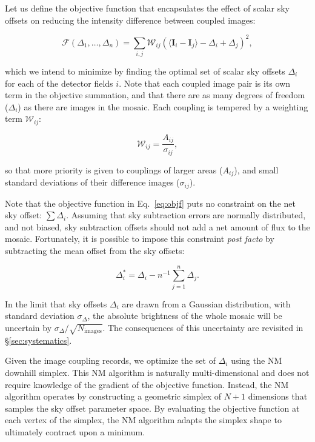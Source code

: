 \documentclass[iop]{emulateapj}
\newcommand{\vect}[1]{\boldsymbol{#1}} %
\newcommand{\Eq}[1]{Eq.~\ref{eq:#1}}  %
\newcommand{\Sec}[1]{\S\ref{sec:#1}}  %
\begin{document}
Let us define the objective function that encapsulates the effect of scalar sky offsets on reducing the intensity difference between coupled images:

\begin{equation}
    \mathcal{F} \left(\Delta_1,\ldots,\Delta_n \right) = \sum_{i,j} \mathcal{W}_{ij} \left( \langle \vect{I}_i - \vect{I}_j \rangle - \Delta_i + \Delta_j \right)^2,
    \label{eq:objf}
\end{equation}

\noindent which we intend to minimize by finding the optimal set of scalar sky offsets $\Delta_i$ for each of the detector fields $i$.
Note that each coupled image pair is its own term in the objective summation, and that there are as many degrees of freedom ($\Delta_i$) as there are images in the mosaic.
Each coupling is tempered by a weighting term $\mathcal{W}_{ij}$:

\begin{equation}
    \mathcal{W}_{ij} = \frac{A_{ij}}{\sigma_{ij}},
\end{equation}

\noindent so that more priority is given to couplings of larger areas ($A_{ij}$), and small standard deviations of their difference images ($\sigma_{ij}$).

Note that the objective function in \Eq{objf} puts no constraint on the net sky offset: $\sum \Delta_i$.
Assuming that sky subtraction errors are normally distributed, and not biased, sky subtraction offsets should not add a net amount of flux to the mosaic.
Fortunately, it is possible to impose this constraint \textit{post facto} by subtracting the mean offset from the sky offsets:

\begin{equation}
    \Delta_i^* = \Delta_i - n^{-1}\sum_{j=1}^n \Delta_j.
    \label{eq:netzero}
\end{equation}

\noindent In the limit that sky offsets $\Delta_i$ are drawn from a Gaussian distribution, with standard deviation $\sigma_\Delta$, the absolute brightness of the whole mosaic will be uncertain by $\sigma_\Delta / \sqrt{N_\mathrm{images}}$.
The consequences of this uncertainty are revisited in \Sec{systematics}.

Given the image coupling records, we optimize the set of $\Delta_i$ using the NM downhill simplex.
This NM algorithm is naturally multi-dimensional and does not require knowledge of the gradient of the objective function.
Instead, the NM algorithm operates by constructing a geometric simplex of $N+1$ dimensions that samples the sky offset parameter space.
By evaluating the objective function at each vertex of the simplex, the NM algorithm adapts the simplex shape to ultimately contract upon a minimum.
\end{document}
